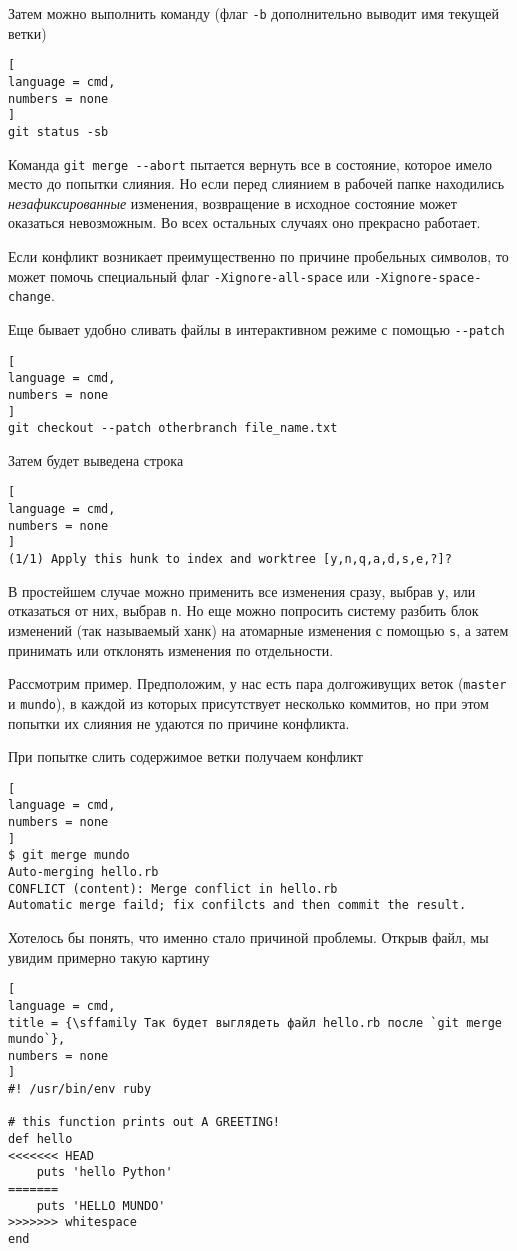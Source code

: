 \documentclass[%
	11pt,
	a4paper,
	utf8,
		]{article}
\begin{document}
Затем можно выполнить команду (флаг \verb|-b| дополнительно выводит имя текущей ветки)
\begin{lstlisting}[
language = cmd,
numbers = none
]
git status -sb
\end{lstlisting}

Команда \verb|git merge --abort| пытается вернуть все в состояние, которое имело место до попытки слияния. Но если перед слиянием в рабочей папке находились \emph{незафиксированные} изменения, возвращение в исходное состояние может оказаться невозможным. Во всех остальных случаях оно прекрасно работает.

Если конфликт возникает преимущественно по причине пробельных символов, то может помочь специальный флаг \verb|-Xignore-all-space| или \verb|-Xignore-space-change|.

Еще бывает удобно сливать файлы в интерактивном режиме с помощью \verb|--patch|
\begin{lstlisting}[
language = cmd,
numbers = none
]
git checkout --patch otherbranch file_name.txt
\end{lstlisting}

Затем будет выведена строка
\begin{lstlisting}[
language = cmd,
numbers = none
]
(1/1) Apply this hunk to index and worktree [y,n,q,a,d,s,e,?]?
\end{lstlisting}

В простейшем случае можно применить все изменения сразу, выбрав \texttt{y}, или отказаться от них, выбрав \texttt{n}. Но еще можно попросить систему разбить блок изменений (так называемый ханк) на атомарные изменения с помощью \texttt{s}, а затем принимать или отклонять изменения по отдельности.

Рассмотрим пример. Предположим, у нас есть пара долгоживущих веток (\texttt{master} и \texttt{mundo}), в каждой из которых присутствует несколько коммитов, но при этом попытки их слияния не удаются по причине конфликта.

При попытке слить содержимое ветки получаем конфликт
\begin{lstlisting}[
language = cmd,
numbers = none
]
$ git merge mundo
Auto-merging hello.rb
CONFLICT (content): Merge conflict in hello.rb
Automatic merge faild; fix confilcts and then commit the result.
\end{lstlisting}

Хотелось бы понять, что именно стало причиной проблемы. Открыв файл, мы увидим примерно такую картину
\begin{lstlisting}[
language = cmd,
title = {\sffamily Так будет выглядеть файл hello.rb после `git merge mundo`},
numbers = none
]
#! /usr/bin/env ruby

# this function prints out A GREETING!
def hello
<<<<<<< HEAD
    puts 'hello Python'
=======
    puts 'HELLO MUNDO'
>>>>>>> whitespace
end

\end{lstlisting}
\end{document}
